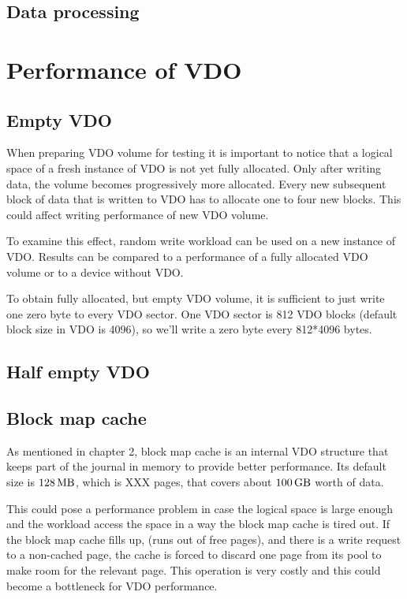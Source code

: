 \documentclass[
  color, %
  table, %
  lof,   %
  lot,   %
]{fithesis3}
\begin{document}
\section{Data processing}


\chapter{Performance of VDO}
\label{testing}
\section{Empty VDO}
When preparing VDO volume for testing it is important to notice that a logical space of a fresh instance of VDO is not yet fully allocated. Only after writing data, the volume becomes progressively more allocated. Every new subsequent block of data that is written to VDO has to allocate one to four new blocks. This could affect writing performance of new VDO volume.

To examine this effect, random write workload can be used on a new instance of VDO. Results can be compared to a performance of a fully allocated VDO volume or to a device without VDO.

To obtain fully allocated, but empty VDO volume, it is sufficient to just write one zero byte to every VDO sector. One VDO sector is 812 VDO blocks (default block size in VDO is 4096), so we'll write a zero byte every 812*4096 bytes. 








\section{Half empty VDO}
\section{Block map cache}
As mentioned in chapter 2, block map cache is an internal VDO structure that keeps part of the journal in memory to provide better performance. Its default size is $\SI{128}{\mega\byte}$, which is XXX pages, that covers about $\SI{100}{\giga\byte}$ worth of data. 

This could pose a performance problem in case the logical space is large enough and the workload access the space in a way the block map cache is tired out. If the block map cache fills up, (runs out of free pages), and there is a write request to a non-cached page, the cache is forced to discard one page from its pool to make room for the relevant page. This operation is very costly and this could become a bottleneck for VDO performance.
\end{document}
